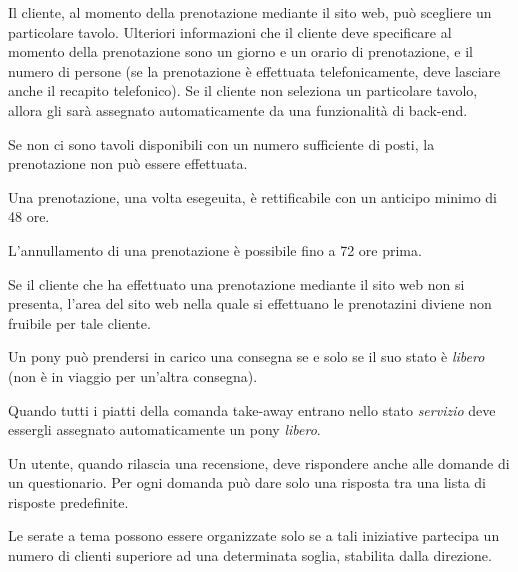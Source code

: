 \begin{enumbusinessrules}
\item Il cliente, al momento della prenotazione mediante il sito web, può scegliere un particolare tavolo. Ulteriori informazioni che il cliente deve specificare al momento della prenotazione sono un giorno e un orario di prenotazione, e il numero di persone (se la prenotazione è effettuata telefonicamente, deve lasciare anche il recapito telefonico). Se il cliente non seleziona un particolare tavolo, allora gli sarà assegnato automaticamente da una funzionalità di back-end.
\item Se non ci sono tavoli disponibili con un numero sufficiente di posti, la prenotazione non può essere effettuata.
\item Una prenotazione, una volta esegeuita, è rettificabile con un anticipo minimo di 48 ore.
\item L'annullamento di una prenotazione è possibile fino a 72 ore prima.
\item Se il cliente che ha effettuato una prenotazione mediante il sito web non si presenta, l'area del sito web nella quale si effettuano le prenotazini diviene non fruibile per tale cliente.
\item Un pony può prendersi in carico una consegna se e solo se il suo stato è {\it libero} (non è in viaggio per un'altra consegna).
\item Quando tutti i piatti della comanda take-away entrano nello stato {\it servizio} deve essergli assegnato automaticamente un pony {\it libero}.
\item\label{br.surveyanswers} Un utente, quando rilascia una recensione, deve rispondere anche alle domande di un questionario. Per ogni domanda può dare solo una risposta tra una lista di risposte predefinite.
\item Le serate a tema possono essere organizzate solo se a tali iniziative partecipa un numero di clienti superiore ad una determinata soglia, stabilita dalla direzione.
\end{enumbusinessrules}
